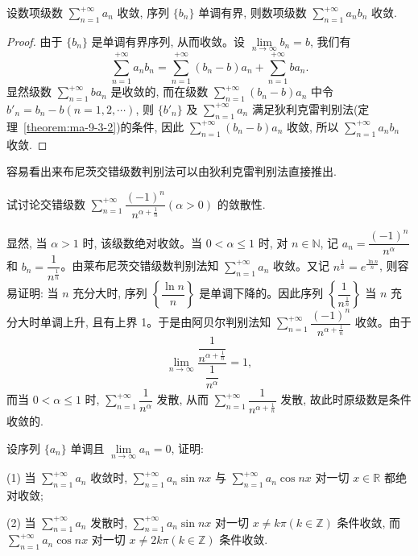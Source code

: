 \begin{theorem}[{阿贝尔判别法}]\label{theorem:ma-9-3-3}
设数项级数 $\sum\limits_{n=1}^{+\infty}a_n$ 收敛, 序列 $\{b_n\}$ 单调有界, 则数项级数 $\sum\limits_{n=1}^{+\infty}a_nb_n$ 收敛.
\end{theorem}


\begin{proof}
由于 $\{b_n\}$ 是单调有界序列, 从而收敛。设 $\lim\limits_{n\to\infty}b_n=b$, 我们有
\[
  \sum_{n=1}^{+\infty}a_nb_n
  =\sum_{n=1}^{+\infty}(b_n-b)a_n+\sum_{n=1}^{+\infty}ba_n.
\]
显然级数 $\sum\limits_{n=1}^{+\infty}ba_n$ 是收敛的, 而在级数 $\sum\limits_{n=1}^{+\infty}(b_n-b)a_n$ 中令 $b'_n=b_n-b(n=1,2,\cdots)$, 则 $\{b'_n\}$ 及 $\sum\limits_{n=1}^{+\infty}a_n$ 满足狄利克雷判别法(定理~\ref{theorem:ma-9-3-2})的条件, 因此 $\sum\limits_{n=1}^{+\infty}(b_n-b)a_n$ 收敛, 所以 $\sum\limits_{n=1}^{+\infty}a_nb_n$ 收敛.
\end{proof}


\begin{remark}\label{remark:ma-9-source-64}
容易看出来布尼茨交错级数判别法可以由狄利克雷判别法直接推出.
\end{remark}


\begin{example}\label{example:ma-9-3-2}
试讨论交错级数 $\sum\limits_{n=1}^{+\infty}\dfrac{(-1)^n}{n^{\alpha+\frac1n}}(\alpha>0)$ 的敛散性.
\end{example}


\begin{solve}
显然, 当 $\alpha>1$ 时, 该级数绝对收敛。当 $0<\alpha\leq1$ 时, 对 $n\in\mathbb{N}$, 记 $a_n=\dfrac{(-1)^n}{n^\alpha}$ 和 $b_n=\dfrac1{n^{\frac1n}}$。由莱布尼茨交错级数判别法知 $\sum\limits_{n=1}^{+\infty}a_n$ 收敛。又记 $n^{\frac1n}=e^{\frac{\ln n}{n}}$, 则容易证明: 当 $n$ 充分大时, 序列 $\left\{\dfrac{\ln n}{n}\right\}$ 是单调下降的。因此序列 $\left\{\dfrac1{n^{\frac1n}}\right\}$ 当 $n$ 充分大时单调上升, 且有上界 1。于是由阿贝尔判别法知 $\sum\limits_{n=1}^{+\infty}\dfrac{(-1)^n}{n^{\alpha+\frac1n}}$ 收敛。由于
\[
  \lim_{n\to\infty}\frac{\dfrac1{n^{\alpha+\frac1n}}}{\dfrac1{n^\alpha}}=1,
\]
而当 $0<\alpha\leq1$ 时, $\sum\limits_{n=1}^{+\infty}\dfrac1{n^\alpha}$ 发散, 从而 $\sum\limits_{n=1}^{+\infty}\dfrac1{n^{\alpha+\frac1n}}$ 发散, 故此时原级数是条件收敛的.
\end{solve}


\begin{example}\label{example:ma-9-3-3}
设序列 $\{a_n\}$ 单调且 $\lim\limits_{n\to\infty}a_n=0$, 证明:

(1) 当 $\sum\limits_{n=1}^{+\infty}a_n$ 收敛时, $\sum\limits_{n=1}^{+\infty}a_n\sin nx$ 与 $\sum\limits_{n=1}^{+\infty}a_n\cos nx$ 对一切 $x\in\mathbb{R}$ 都绝对收敛;

(2) 当 $\sum\limits_{n=1}^{+\infty}a_n$ 发散时, $\sum\limits_{n=1}^{+\infty}a_n\sin nx$ 对一切 $x\neq k\pi(k\in\mathbb{Z})$ 条件收敛, 而 $\sum\limits_{n=1}^{+\infty}a_n\cos nx$ 对一切 $x\neq2k\pi(k\in\mathbb{Z})$ 条件收敛.
\end{example}


